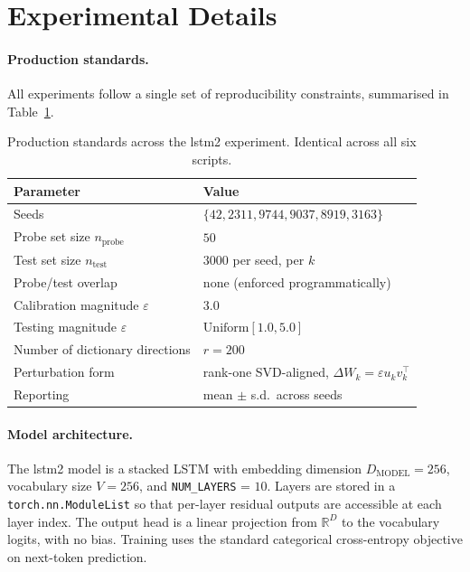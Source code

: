 \documentclass[11pt,a4paper]{article}
\begin{document}
\section{Experimental Details}
\label{app:exp-details}

\paragraph{Production standards.}
All experiments follow a single set of reproducibility constraints, summarised in Table~\ref{tab:standards}.

\begin{table}[H]
\centering
\caption{Production standards across the lstm2 experiment. Identical across all six scripts.}
\label{tab:standards}
\renewcommand{\arraystretch}{1.25}
\vspace{4pt}
\begin{tabular}{l|l}
\toprule
\textbf{Parameter} & \textbf{Value} \\
\midrule
Seeds                                 & $\{42, 2311, 9744, 9037, 8919, 3163\}$ \\
Probe set size $n_{\mathrm{probe}}$   & $50$ \\
Test set size $n_{\mathrm{test}}$     & $3000$ per seed, per $k$ \\
Probe/test overlap                    & none (enforced programmatically) \\
Calibration magnitude $\varepsilon$   & $3.0$ \\
Testing magnitude $\varepsilon$       & $\mathrm{Uniform}[1.0, 5.0]$ \\
Number of dictionary directions       & $r = 200$ \\
Perturbation form                     & rank-one SVD-aligned, $\Delta W_k = \varepsilon u_k v_k^\top$ \\
Reporting                             & mean $\pm$ s.d.\ across seeds \\
\bottomrule
\end{tabular}
\end{table}

\paragraph{Model architecture.}
The lstm2 model is a stacked LSTM with embedding dimension $D_{\mathrm{MODEL}} = 256$, vocabulary size $V = 256$, and \texttt{NUM\_LAYERS} = $10$. Layers are stored in a \texttt{torch.nn.ModuleList} so that per-layer residual outputs are accessible at each layer index. The output head is a linear projection from $\mathbb{R}^{D}$ to the vocabulary logits, with no bias. Training uses the standard categorical cross-entropy objective on next-token prediction.
\end{document}
